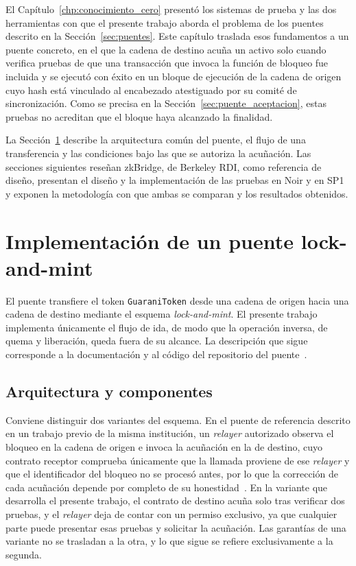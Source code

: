 El Capítulo~\ref{chp:conocimiento_cero} presentó los sistemas de prueba y las dos herramientas con
que el presente trabajo aborda el problema de los puentes descrito en la
Sección~\ref{sec:puentes}. Este capítulo traslada esos fundamentos a un puente concreto, en el que
la cadena de destino acuña un activo solo cuando verifica pruebas de que una transacción que invoca
la función de bloqueo fue incluida y se ejecutó con éxito en un bloque de ejecución de la cadena
de origen cuyo hash está vinculado al encabezado atestiguado por su comité de sincronización. Como se precisa en la
Sección~\ref{sec:puente_aceptacion}, estas pruebas no acreditan que el bloque haya alcanzado la
finalidad.

La Sección~\ref{sec:lock_and_mint} describe la arquitectura común del puente, el flujo de una
transferencia y las condiciones bajo las que se autoriza la acuñación. Las secciones siguientes
reseñan zkBridge, de Berkeley RDI, como referencia de diseño, presentan el diseño y la
implementación de las pruebas en Noir y en SP1 y exponen la metodología con que ambas se comparan
y los resultados obtenidos.

\section{Implementación de un puente lock-and-mint}
\label{sec:lock_and_mint}

El puente transfiere el token \texttt{GuaraniToken} desde una cadena de origen hacia una cadena de
destino mediante el esquema \textit{lock-and-mint}. El presente trabajo implementa únicamente el
flujo de ida, de modo que la operación inversa, de quema y liberación, queda fuera de su alcance.
La descripción que sigue corresponde a la documentación y al código del repositorio del
puente~\cite{zkguaranibridgesp1}.

\subsection{Arquitectura y componentes}
\label{sec:puente_arquitectura}

Conviene distinguir dos variantes del esquema. En el puente de referencia descrito en un trabajo previo de la
misma institución, un \textit{relayer} autorizado observa el bloqueo en la cadena de origen e invoca la
acuñación en la de destino, cuyo contrato receptor comprueba únicamente que la llamada proviene de
ese \textit{relayer} y que el identificador del bloqueo no se procesó antes, por lo que la
corrección de cada acuñación depende por completo de su honestidad~\cite{figueredo2026zkbridge,
guaranibridgevanilla}. En la variante que desarrolla el presente trabajo, el contrato de destino
acuña solo tras verificar dos pruebas, y el \textit{relayer} deja de contar con un permiso
exclusivo, ya que cualquier parte puede presentar esas pruebas y solicitar la acuñación. Las garantías
de una variante no se trasladan a la otra, y lo que sigue se refiere exclusivamente a la segunda.

